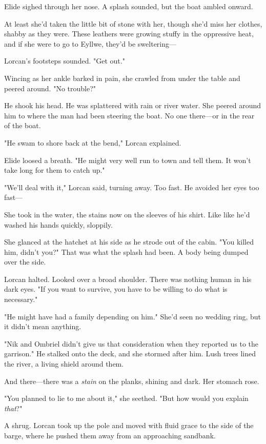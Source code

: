 Elide sighed through her nose.
A splash sounded, but the boat ambled onward.

At least she'd taken the little bit of stone with her, though she'd miss her clothes, shabby as they were.
These leathers were growing stuffy in the oppressive heat, and if she were to go to Eyllwe, they'd be sweltering---

Lorcan's footsteps sounded.
"Get out."

Wincing as her ankle barked in pain, she crawled from under the table and peered around.
"No trouble?"

He shook his head.
He was splattered with rain or river water.
She peered around him to where the man had been steering the boat.
No one there---or in the rear of the boat.

"He swam to shore back at the bend," Lorcan explained.

Elide loosed a breath.
"He might very well run to town and tell them.
It won't take long for them to catch up."

"We'll deal with it," Lorcan said, turning away.
Too fast.
He avoided her eyes too fast---

She took in the water, the stains now on the sleeves of his shirt.
Like  like he'd washed his hands quickly, sloppily.

She glanced at the hatchet at his side as he strode out of the cabin.
"You killed him, didn't you?"
That was what the splash had been.
A body being dumped over the side.

Lorcan halted.
Looked over a broad shoulder.
There was nothing human in his dark eyes.
"If you want to survive, you have to be willing to do what is necessary."

"He might have had a family depending on him."
She'd seen no wedding ring, but it didn't mean anything.

"Nik and Ombriel didn't give us that consideration when they reported us to the garrison."
He stalked onto the deck, and she stormed after him.
Lush trees lined the river, a living shield around them.

And there---there was a \emph{stain} on the planks, shining and dark.
Her stomach rose.

"You planned to lie to me about it," she seethed.
"But how would you explain \emph{that}?"

A shrug.
Lorcan took up the pole and moved with fluid grace to the side of the barge, where he pushed them away from an approaching sandbank.

